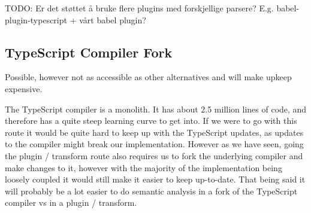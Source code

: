 TODO: Er det støttet å bruke flere plugins med forskjellige parsere?
E.g. babel-plugin-typescript + vårt babel plugin?

\subsection{TypeScript Compiler Fork}\label{subsec:typescript-compiler-fork}

Possible, however not as accessible as other alternatives and will make upkeep expensive.

The TypeScript compiler is a monolith.
It has about 2.5 million lines of code, and therefore has a quite steep learning curve to get into.
If we were to go with this route it would be quite hard to keep up with the TypeScript updates, as updates to the compiler might break our implementation.
However as we have seen, going the plugin / transform route also requires us to fork the underlying compiler and make changes to it, however with the majority of the implementation being loosely coupled it would still make it easier to keep up-to-date.
That being said it will probably be a lot easier to do semantic analysis in a fork of the TypeScript compiler vs in a plugin / transform.
